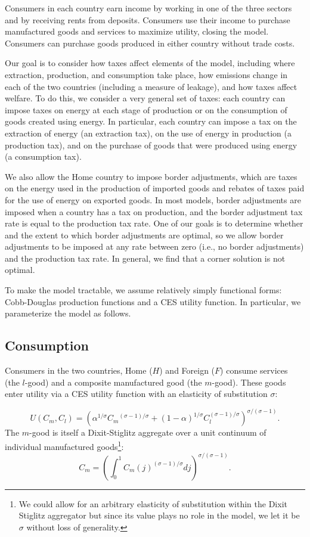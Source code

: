 \documentclass[notitlepage,12pt]{article}
\begin{document}
Consumers in each country earn income by working in one of the three sectors
and by receiving rents from deposits. Consumers use their income to purchase
manufactured goods and services to maximize utility, closing the model.
Consumers can purchase goods produced in either country without trade costs.

Our goal is to consider how taxes affect elements of the model, including
where extraction, production, and consumption take place, how emissions
change in each of the two countries (including a measure of leakage), and
how taxes affect welfare. To do this, we consider a very general set of
taxes: each country can impose taxes on energy at each stage of production
or on the consumption of goods created using energy. In particular, each
country can impose a tax on the extraction of energy (an extraction tax), on
the use of energy in production (a production tax), and on the purchase of
goods that were produced using energy (a consumption tax).

We also allow the Home country to impose border adjustments, which are taxes
on the energy used in the production of imported goods and rebates of taxes
paid for the use of energy on exported goods. In most models, border
adjustments are imposed when a country has a tax on production, and the
border adjustment tax rate is equal to the production tax rate. One of our
goals is to determine whether and the extent to which border adjustments are
optimal, so we allow border adjustments to be imposed at any rate between
zero (i.e., no border adjustments) and the production tax rate. In general,
we find that a corner solution is not optimal.

To make the model tractable, we assume relatively simply functional forms:
Cobb-Douglas production functions and a CES utility function. In particular,
we parameterize the model as follows.

\subsection{Consumption}

Consumers in the two countries, Home ($H$) and Foreign ($F$) consume
services (the $l$-good) and a composite manufactured good (the $m$-good).
These goods enter utility via a CES utility function with an elasticity of
substitution $\sigma $:

\begin{equation}
U\left( C_{m},C_{l}\right) =\left( \alpha ^{1/\sigma }C_{m}{}^{\left( \sigma
-1\right) /\sigma }+\left( 1-\alpha \right) ^{1/\sigma }C_{l}^{\left( \sigma
-1\right) /\sigma }\right) ^{\sigma /\left( \sigma -1\right) }.
\label{Utility}
\end{equation}%
The $m$-good is itself a Dixit-Stiglitz aggregate over a unit continuum of
individual manufactured goods\footnote{%
We could allow for an arbitrary elasticity of substitution within the Dixit
Stiglitz aggregator but since its value plays no role in the model, we let
it be $\sigma $ without loss of generality.}:%
\begin{equation*}
C_{m}=\left( \int_{0}^{1}C_{m}(j)^{\left( \sigma -1\right) /\sigma
}dj\right) ^{\sigma /\left( \sigma -1\right) }.
\end{equation*}
\end{document}
